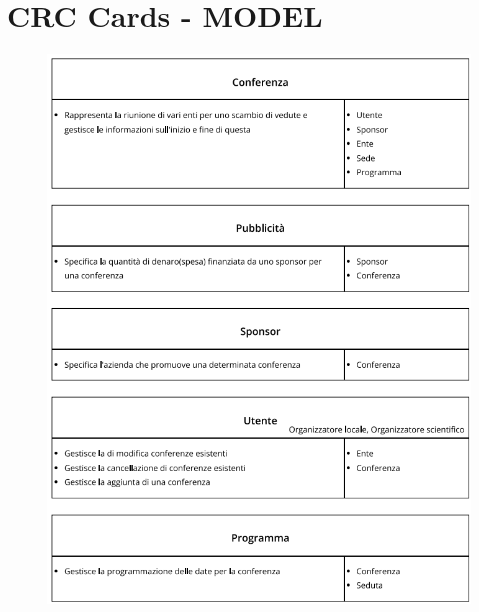 \documentclass[a4paper,italian,10pt,openany]{book}
\begin{document}
	\section{CRC Cards - MODEL}
	\begin{figure}[h!]
	\centering
	\includegraphics[width=15.8cm]{crc_cards1}
	\end{figure}
\end{document}
